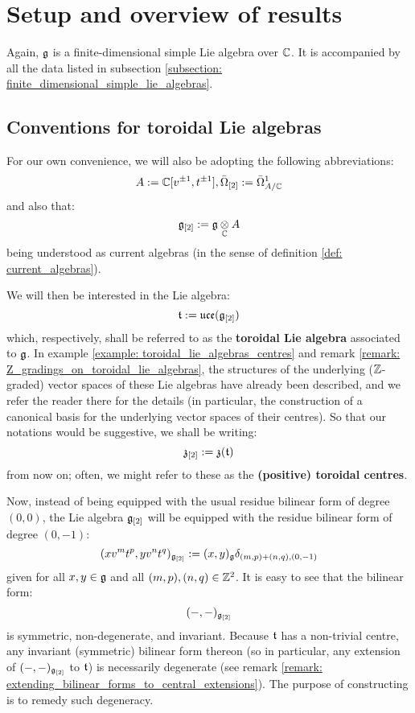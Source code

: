 \section{Setup and overview of results}
    Again, $\mathfrak{g}$ is a finite-dimensional simple Lie algebra over $\mathbb{C}$. It is accompanied by all the data listed in subsection \ref{subsection: finite_dimensional_simple_lie_algebras}. 

    \subsection{Conventions for toroidal Lie algebras} \label{subsection: toroidal_lie_algebra_conventions}
        For our own convenience, we will also be adopting the following abbreviations:
            $$A := \mathbb{C}[v^{\pm 1}, t^{\pm 1}], \bar{\Omega}_{[2]} := \bar{\Omega}^1_{A/\mathbb{C}}$$
        and also that:
            $$\g_{[2]} := \g \tensor_{\bbC} A$$
        being understood as current algebras (in the sense of definition \ref{def: current_algebras}).
    
        We will then be interested in the Lie algebra:
            $$\mathfrak{t} := \mathfrak{uce}(\mathfrak{g}_{[2]})$$
        which, respectively, shall be referred to as the \textbf{toroidal Lie algebra} associated to $\mathfrak{g}$. In example \ref{example: toroidal_lie_algebras_centres} and remark \ref{remark: Z_gradings_on_toroidal_lie_algebras}, the structures of the underlying ($\mathbb{Z}$-graded) vector spaces of these Lie algebras have already been described, and we refer the reader there for the details (in particular, the construction of a canonical basis for the underlying vector spaces of their centres). So that our notations would be suggestive, we shall be writing:
            $$\mathfrak{z}_{[2]} := \mathfrak{z}(\mathfrak{t})$$
        from now on; often, we might refer to these as the \textbf{(positive) toroidal centres}.
        
        Now, instead of being equipped with the usual residue bilinear form of degree $(0, 0)$, the Lie algebra $\mathfrak{g}_{[2]}$ will be equipped with the residue bilinear form of degree $(0, -1)$:
            $$(x v^m t^p, y v^n t^q)_{\mathfrak{g}_{[2]}} := (x, y)_{\mathfrak{g}} \delta_{(m, p) + (n, q), (0, -1)}$$
        given for all $x, y \in \mathfrak{g}$ and all $(m, p), (n, q) \in \mathbb{Z}^2$. It is easy to see that the bilinear form:
            $$(-, -)_{\mathfrak{g}_{[2]}}$$
        is symmetric, non-degenerate, and invariant. Because $\mathfrak{t}$ has a non-trivial centre, any invariant (symmetric) bilinear form thereon (so in particular, any extension of $(-, -)_{\mathfrak{g}_{[2]}}$ to $\mathfrak{t}$) is necessarily degenerate (see remark \ref{remark: extending_bilinear_forms_to_central_extensions}). The purpose of constructing  is to remedy such degeneracy.


